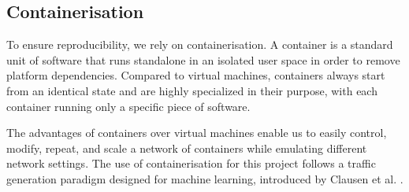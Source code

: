 \documentclass[runningheads,11pt]{llncs}\usepackage[]{graphicx}\usepackage[]{color}
\begin{document}
\subsection{Containerisation}

To ensure reproducibility, we rely on containerisation. A container is a standard unit of software that runs standalone in an isolated user space in order to remove platform dependencies. Compared to virtual machines, containers always start from an identical state and are highly specialized in their purpose, with each container running only a specific piece of software. 

The advantages of containers over virtual machines enable us to easily control, modify, repeat, and scale a network of containers while emulating different network settings. The use of containerisation for this project follows a traffic generation paradigm designed for machine learning, introduced by Clausen et al. \cite{clausen2019traffic}. %






\end{document}
